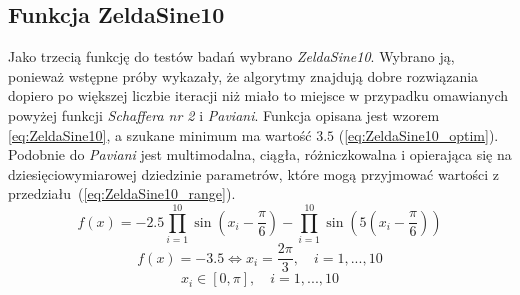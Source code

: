 \subsection{Funkcja ZeldaSine10}
Jako trzecią funkcję do testów badań wybrano \emph{ZeldaSine10}. Wybrano ją, ponieważ wstępne próby wykazały, że algorytmy znajdują dobre rozwiązania dopiero po większej liczbie iteracji niż miało to miejsce w przypadku omawianych powyżej funkcji \emph{Schaffera nr 2} i \emph{Paviani}. Funkcja opisana jest wzorem \ref{eq:ZeldaSine10}, a szukane minimum ma wartość $3.5$ (\ref{eq:ZeldaSine10_optim}). Podobnie do \emph{Paviani} jest multimodalna, ciągła, różniczkowalna i opierająca się na dziesięciowymiarowej dziedzinie parametrów, które mogą przyjmować wartości z przedziału~(\ref{eq:ZeldaSine10_range}). 
\begin{equation}\label{eq:ZeldaSine10}
f(x)=-2.5\prod_{i=1}^{10} \sin\left(x_i-\frac{\pi}{6}\right) - \prod_{i=1}^{10} \sin\left(5\left(x_i-\frac{\pi}{6}\right)\right)
\end{equation}
\begin{equation} \label{eq:ZeldaSine10_optim}
f(x)=-3.5 \Leftrightarrow x_i = \frac{2\pi}{3},\quad i = 1, ..., 10
\end{equation}
\begin{equation} \label{eq:ZeldaSine10_range}
x_i\in[0,\pi], \quad i=1,...,10
\end{equation}

